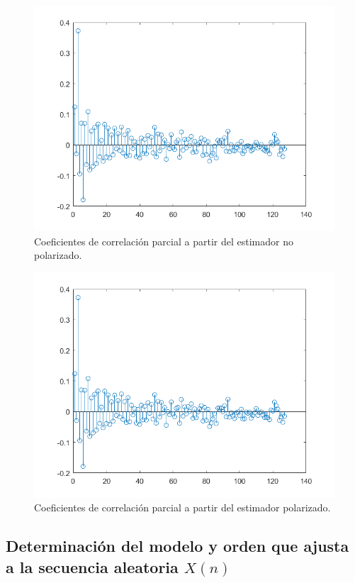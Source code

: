 \begin{figure}[H] %
\centering
\includegraphics[scale=0.45]{../EJ1/coefCorrParcialNP}
\caption{Coeficientes de correlaci\'on parcial a partir del estimador no polarizado.}
\label{fiNP}
\end{figure}

\begin{figure}[H] %
\centering
\includegraphics[scale=0.45]{../EJ1/coefCorrParcialP}
\caption{Coeficientes de correlaci\'on parcial a partir del estimador polarizado.}
\label{fiP}
\end{figure}

\subsection{Determinaci\'on del modelo y orden que ajusta a la secuencia aleatoria $X(n)$}

